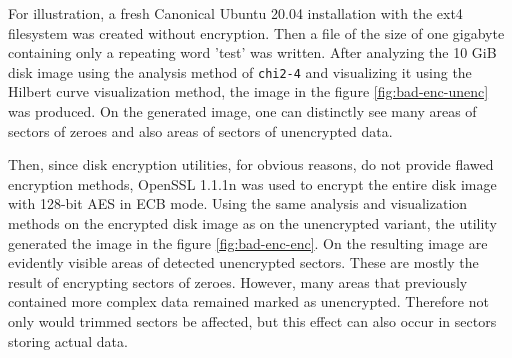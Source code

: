 \documentclass[
  digital, %
  oneside, %
  lof,     %
  lot,     %
]{fithesis4}
\begin{document}
For illustration, a fresh Canonical Ubuntu 20.04\cite{ubuntu} installation with the ext4 filesystem was created without encryption.
Then a file of the size of one gigabyte containing only a repeating word 'test' was written.
After analyzing the 10 GiB disk image using the analysis method of \texttt{chi2-4} and visualizing it using the Hilbert curve visualization method, the image in the figure \ref{fig:bad-enc-unenc} was produced.
On the generated image, one can distinctly see many areas of sectors of zeroes and also areas of sectors of unencrypted data.

Then, since disk encryption utilities, for obvious reasons, do not provide flawed encryption methods, OpenSSL 1.1.1n\cite{openssl} was used to encrypt the entire disk image with 128-bit AES in ECB mode.
Using the same analysis and visualization methods on the encrypted disk image as on the unencrypted variant, the utility generated the image in the figure \ref{fig:bad-enc-enc}.
On the resulting image are evidently visible areas of detected unencrypted sectors.
These are mostly the result of encrypting sectors of zeroes.
However, many areas that previously contained more complex data remained marked as unencrypted.
Therefore not only would trimmed sectors be affected, but this effect can also occur in sectors storing actual data.
\end{document}
